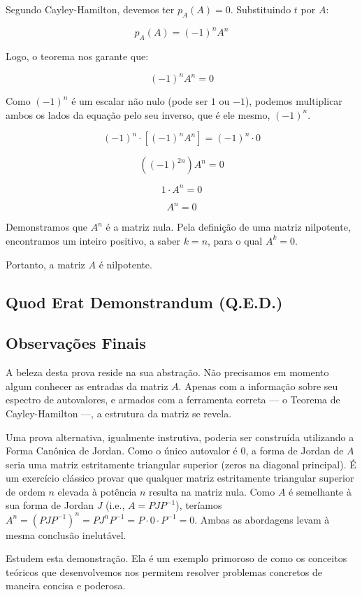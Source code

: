 Segundo Cayley-Hamilton, devemos ter $p_A(A) = 0$. Substituindo $t$ por $A$:

\[
p_A(A) = (-1)^n A^n
\]

Logo, o teorema nos garante que:

\[
(-1)^n A^n = 0
\]

Como $(-1)^n$ é um escalar não nulo (pode ser $1$ ou $-1$), podemos multiplicar ambos os lados da
equação pelo seu inverso, que é ele mesmo, $(-1)^n$.

\[
(-1)^n \cdot [(-1)^n A^n] = (-1)^n \cdot 0
\]

\[
((-1)^{2n}) A^n = 0
\]

\[
1 \cdot A^n = 0
\]

\[
A^n = 0
\]

Demonstramos que $A^n$ é a matriz nula. Pela definição de uma matriz nilpotente, encontramos um
inteiro positivo, a saber $k=n$, para o qual $A^k=0$.

Portanto, a matriz $A$ é nilpotente.

\subsection*{Quod Erat Demonstrandum (Q.E.D.)}

\subsection*{Observações Finais}

A beleza desta prova reside na sua abstração. Não precisamos em momento algum conhecer as
entradas da matriz $A$. Apenas com a informação sobre seu espectro de autovalores, e armados com
a ferramenta correta — o Teorema de Cayley-Hamilton —, a estrutura da matriz se revela.

Uma prova alternativa, igualmente instrutiva, poderia ser construída utilizando a Forma Canônica de
Jordan. Como o único autovalor é $0$, a forma de Jordan de $A$ seria uma matriz estritamente triangular
superior (zeros na diagonal principal). É um exercício clássico provar que qualquer matriz
estritamente triangular superior de ordem $n$ elevada à potência $n$ resulta na matriz nula. Como $A$ é
semelhante à sua forma de Jordan $J$ (i.e., $A = PJP^{-1}$), teríamos $A^n = (PJP^{-1})^n =
P J^n P^{-1} = P \cdot 0 \cdot P^{-1} = 0$. Ambas as abordagens levam à mesma conclusão inelutável.

Estudem esta demonstração. Ela é um exemplo primoroso de como os conceitos teóricos que
desenvolvemos nos permitem resolver problemas concretos de maneira concisa e poderosa.